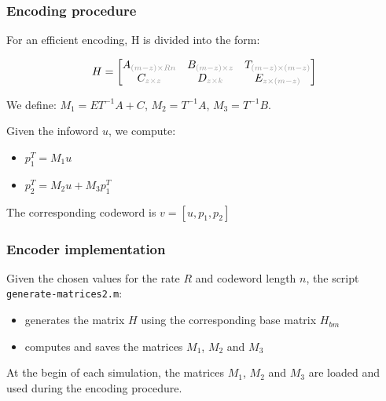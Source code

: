 \documentclass[]{beamer}
\begin{document}
\begin{frame}
\transwipe[direction=0]
\frametitle{Encoding procedure}
For an efficient encoding, H is divided into the form:

\begin{equation*}
H = 
	\begin{bmatrix}
		A_{\textcolor{black!40}{(m-z)\times Rn}} & B_{\textcolor{black!40}{(m-z)\times z}} & T_{\textcolor{black!40}{(m-z) \times (m-z)}} \\
		C_{\textcolor{black!40}{z\times z}} &D_{\textcolor{black!40}{z \times k}} & E_{\textcolor{black!40}{z \times (m-z)}} \\
	\end{bmatrix}
\end{equation*}

We define: $M_1 = ET^{-1}A+C$, $M_2 = T^{-1}A$, $M_3 = T^{-1}B$.%

\vspace{0.5cm}

Given the infoword $u$, we compute:
\begin{itemize}
\item $p_1^T = M_1u$
\item $p_2^T = M_2u + M_3p_1^T$
\end{itemize}
The corresponding codeword is $v = [u, p_1, p_2]$ 
\end{frame}


\begin{frame}
\transwipe[direction=0]
\frametitle{Encoder implementation}
Given the chosen values for the rate $R$ and codeword length $n$, the script \texttt{generate-matrices2.m}:
\begin{itemize}
\item generates the matrix $H$ using the corresponding base matrix $H_{bm}$
\item computes and saves the matrices $M_1$, $M_2$ and $M_3$
\end{itemize}

\vspace{0.5cm}

At the begin of each simulation, the matrices $M_1$, $M_2$ and $M_3$ are loaded and used during the encoding procedure.


\end{frame}
\end{document}
